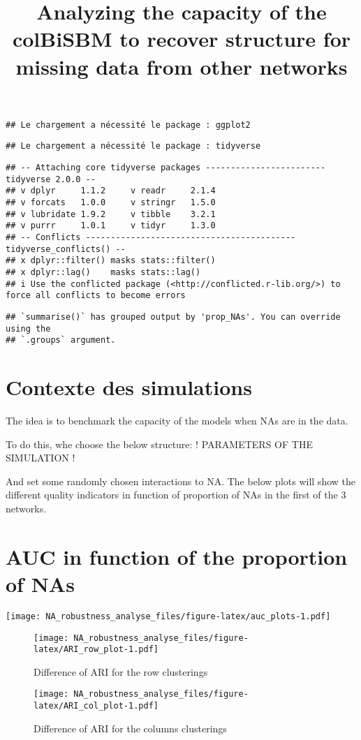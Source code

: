 \documentclass[
]{article}
\title{Analyzing the capacity of the colBiSBM to recover structure for
missing data from other networks}
\author{}
\date{\vspace{-2.5em}}
\begin{document}
\maketitle

\begin{verbatim}
## Le chargement a nécessité le package : ggplot2
\end{verbatim}

\begin{verbatim}
## Le chargement a nécessité le package : tidyverse
\end{verbatim}

\begin{verbatim}
## -- Attaching core tidyverse packages ------------------------ tidyverse 2.0.0 --
## v dplyr     1.1.2     v readr     2.1.4
## v forcats   1.0.0     v stringr   1.5.0
## v lubridate 1.9.2     v tibble    3.2.1
## v purrr     1.0.1     v tidyr     1.3.0
## -- Conflicts ------------------------------------------ tidyverse_conflicts() --
## x dplyr::filter() masks stats::filter()
## x dplyr::lag()    masks stats::lag()
## i Use the conflicted package (<http://conflicted.r-lib.org/>) to force all conflicts to become errors
\end{verbatim}

\begin{verbatim}
## `summarise()` has grouped output by 'prop_NAs'. You can override using the
## `.groups` argument.
\end{verbatim}

\hypertarget{contexte-des-simulations}{%
\section{Contexte des simulations}\label{contexte-des-simulations}}

The idea is to benchmark the capacity of the models when NAs are in the
data.

To do this, whe choose the below structure: ! PARAMETERS OF THE
SIMULATION !

And set some randomly chosen interactions to NA. The below plots will
show the different quality indicators in function of proportion of NAs
in the first of the 3 networks.

\hypertarget{auc-in-function-of-the-proportion-of-nas}{%
\section{AUC in function of the proportion of
NAs}\label{auc-in-function-of-the-proportion-of-nas}}

\texttt{[image: NA\_robustness\_analyse\_files/figure-latex/auc\_plots-1.pdf]}

\begin{figure}
\centering
\texttt{[image: NA\_robustness\_analyse\_files/figure-latex/ARI\_row\_plot-1.pdf]}
\caption{Difference of ARI for the row clusterings}
\end{figure}

\begin{figure}
\centering
\texttt{[image: NA\_robustness\_analyse\_files/figure-latex/ARI\_col\_plot-1.pdf]}
\caption{Difference of ARI for the columns clusterings}
\end{figure}
\end{document}
